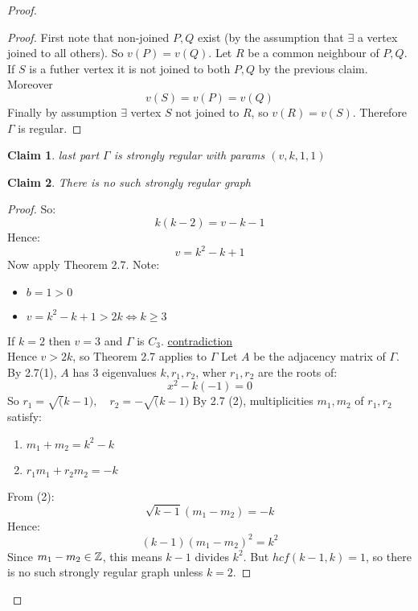 \documentclass[]{article}
\newtheorem*{clm}{Claim}
\theoremstyle{definition}
\theoremstyle{remark}
\numberwithin{equation}{section}
\begin{document}
\begin{proof}
\begin{proof}
					First note that non-joined $P,Q$ exist (by the assumption that $\exists$ a vertex joined to all others). So $v(P) = v(Q)$. Let $R$ be a common neighbour of $P,Q$. If $S$ is a futher vertex it is not joined to both $P, Q$ by the previous claim. Moreover
					\[ v(S) = v(P) = v(Q)\]
					Finally by assumption $\exists$ vertex $S$ not joined to $R$, so $v(R) = v(S)$. Therefore $\Gamma$ is regular.
					\end{proof}
					\begin{clm}{last part} $\Gamma$ is strongly regular with params $(v, k, 1, 1)$
					\end{clm}
					\begin{clm} There is no such strongly regular graph
					\end{clm}

					\begin{proof}
					So:
					\[k(k-2) = v-k-1\]
					Hence:
					\[v=k^2-k+1\]
					Now apply Theorem 2.7. Note:
						\begin{itemize}
							\item $b = 1 > 0$
							\item $v = k^2-k +1 > 2k \Leftrightarrow k \geq 3$
						\end{itemize}
					If $k =2$ then $v = 3$ and $\Gamma$ is $C_3$. \underline{contradiction}\\
					Hence $v > 2k$, so Theorem 2.7 applies to $\Gamma$
					Let $A$ be the adjacency matrix of $\Gamma$.\\
					By 2.7(1), $A$ has 3 eigenvalues $k, r_1, r_2$, wher $r_1, r_2$ are the roots of:
					\[ x^2 - k(-1) = 0\]
					So $r_1 = \sqrt(k-1),\quad r_2 = -\sqrt(k-1)$
					By 2.7 (2), multiplicities $m_1, m_2$ of $r_1, r_2$ satisfy:
					\begin{enumerate}
						\item $m_1 + m_2 = k^2 -k$
						\item $r_1 m_1 + r_2 m_2 = -k$
					\end{enumerate}
					From (2):
					\[ \sqrt{k-1}(m_1 - m_2) = -k\]
					Hence:
					\[(k-1)(m_1-m_2)^2 = k^2\]
					Since $m_1 - m_2 \in \mathbb{Z}$, this means $k-1$ divides $k^2$.
					But $hcf(k-1, k) = 1$, so there is no such strongly regular graph unless $k = 2$.
					\end{proof}
				\end{proof}
\end{document}
